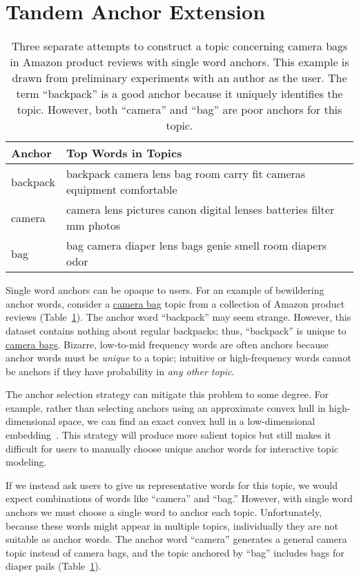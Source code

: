 \section{Tandem Anchor Extension}
\label{sec:multiword-extension}

\begin{table}
\begin{center}
\small
\begin{tabular}{p{} p{}}
\hline\hline
Anchor   & Top Words in Topics\\\hline
backpack & backpack camera lens bag room carry fit cameras equipment comfortable\\
camera   & camera lens pictures canon digital lenses batteries filter mm photos\\
bag      & bag camera diaper lens bags genie smell room diapers odor\\\hline
\end{tabular}
\end{center}
\caption{Three separate attempts to construct a topic concerning camera bags in
Amazon product reviews with single word anchors.
This example is drawn from preliminary experiments with an author as the user.
The term ``backpack'' is a
good anchor because it uniquely identifies the topic. However,
both ``camera'' and ``bag'' are poor anchors for this topic.}
\label{tab:camera}
\end{table}

Single word anchors can be opaque to users.
For an example of bewildering anchor words, consider a \underline{camera bag}
topic from a collection of Amazon product reviews (Table~\ref{tab:camera}).
The anchor word ``backpack'' may seem strange.
However, this dataset contains nothing about regular backpacks; thus, ``backpack'' is unique to \underline{camera bags}.
Bizarre, low-to-mid frequency words are often anchors because anchor words must
be \emph{unique} to a topic;
intuitive or high-frequency words cannot be anchors if they have
probability in \emph{any other topic}.

The anchor selection strategy can mitigate this problem to some degree.
For example, rather than selecting anchors using an approximate convex hull in
high-dimensional space, we can find an exact convex hull in a low-dimensional
embedding~\cite{anchors-tsne}.
This strategy will produce more salient topics but still makes it difficult
for users to manually choose unique anchor words for interactive topic
modeling.

If we instead ask users to give us representative words for this topic, we
would expect combinations of words like ``camera'' and ``bag.''
However, with single word anchors we must choose a single word to anchor each
topic.
Unfortunately, because these words might appear in multiple topics,
individually they are not suitable as anchor words.
The anchor word ``camera'' generates a general camera topic instead of camera
bags, and the topic anchored by ``bag'' includes bags for diaper
pails (Table~\ref{tab:camera}).

